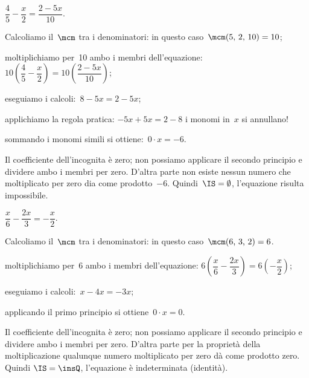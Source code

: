 \begin{exrig}\vspace{1.10ex}
 \begin{esempio}
 $\dfrac{4}{5}-\dfrac{x}{2}=\dfrac{2-5x}{10}$.

\begin{enumeratea}
\item Calcoliamo il~$\mcm$ tra i denominatori: in questo
caso~$\mcm(5\text{,~}2\text{,~}10) = 10$;

\item moltiplichiamo per~10 ambo i membri
dell'equazione:
$10\left(\dfrac{4}{5}-\dfrac{x}{2}\right)=10\left(\dfrac{2-5x}{10}\right)$;

\item eseguiamo i calcoli:~$8-5x=2-5x$;

\item applichiamo la regola pratica:
$-5x+5x=2-8$ i monomi in~$x$ si annullano!

\item sommando i monomi simili si ottiene:~$0\cdot x=-6$.
\end{enumeratea}

Il coefficiente dell'incognita è zero; non possiamo
applicare il secondo principio e dividere ambo i membri per zero.
D'altra parte non esiste nessun numero che moltiplicato
per zero dia come prodotto~$-6$. Quindi~$\IS =\emptyset $,
l'equazione risulta impossibile.
 \end{esempio}
\pagebreak
 \begin{esempio}
$\dfrac{x}{6}-\dfrac{2x}{3}=-{\dfrac{x}{2}}$.

\begin{enumeratea}
\item Calcoliamo il~$\mcm$ tra i denominatori: in questo
caso~$\mcm(6\text{,~}3\text{,~}2) = 6$.

\item moltiplichiamo per~6 ambo i membri
dell'equazione:
$6\left(\dfrac{x}{6}-\dfrac{2x}{3}\right)=6\left(-{\dfrac{x}{2}}\right)$;

\item eseguiamo i calcoli:~$x-4x=-3x$;

\item applicando il primo principio si ottiene~$0\cdot x=0$.

\end{enumeratea}

Il coefficiente dell'incognita è zero; non possiamo
applicare il secondo principio e dividere ambo i membri per zero.
D'altra parte per la proprietà della moltiplicazione
qualunque numero moltiplicato per zero dà come prodotto zero. Quindi
$\IS = \insQ$, l'equazione è indeterminata (identità).
 \end{esempio}
\end{exrig}

